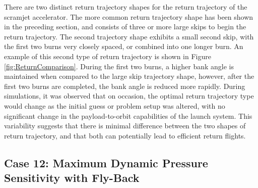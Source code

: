There are two distinct return trajectory shapes for the return trajectory of the scramjet accelerator. The more common return trajectory shape has been shown in the preceding section, and consists of three or more large skips to begin the return trajectory. The second trajectory shape exhibits a small second skip, with the first two burns very closely spaced, or combined into one longer burn. An example of this second type of return trajectory is shown in Figure \ref{fig:ReturnComparison}. During the first two burns, a higher bank angle is maintained when compared to the large skip trajectory shape, however, after the first two burns are completed, the bank angle is reduced more rapidly. 
During simulations, it was observed that on occasion, the optimal return trajectory type would change as the initial guess or problem setup was altered, with no significant change in the payload-to-orbit capabilities of the launch system. This variability suggests that there is minimal difference between the two shapes of return trajectory, and that both can potentially lead to efficient return flights. 





\subsection{Case 12: Maximum Dynamic Pressure Sensitivity with Fly-Back}

